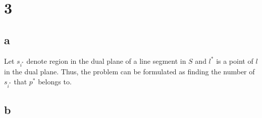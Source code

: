 \section*{3}
\subsection*{a}
Let $s_{i^*}$ denote region in the dual plane of a line segment in $S$ and $l^*$ is a point
of $l$ in the dual plane.  Thus, the problem can be formulated as finding the number
of $s_{i^*}$ that $p^*$ belongs to.

\subsection*{b}
